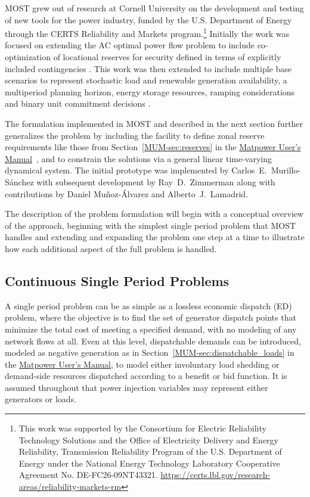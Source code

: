\documentclass[12pt]{article}
\newcommand{\mpver}[0]{7.1}
\newcommand{\matpower}[0]{{\sc Matpower}}
\newcommand{\most}[0]{{MOST}}
\newcommand{\mumurl}[0]{https://matpower.org/docs/MATPOWER-manual-\mpver.pdf}
\newcommand{\mum}[0]{\href{\mumurl}{\matpower{} User's Manual}}
\numberwithin{equation}{section}
\numberwithin{table}{section}
\numberwithin{figure}{section}
\begin{document}
\most{} grew out of research at Cornell University on the development and testing of new tools for the power industry, funded by the U.S. Department of Energy through the CERTS Reliability and Markets program.\footnote{This work was supported by the Consortium for Electric Reliability Technology Solutions and the Office of Electricity Delivery and Energy Reliability, Transmission Reliability Program of the U.S. Department of Energy under the National Energy Technology Laboratory Cooperative Agreement No. DE-FC26-09NT43321. \url{https://certs.lbl.gov/research-areas/reliability-markets-rm}} Initially the work was focused on extending the AC optimal power flow problem to include co-optimization of locational reserves for security defined in terms of explicitly included contingencies \cite{superopf2008,murillo-sanchez2013}. This work was then extended to include multiple base scenarios to represent stochastic load and renewable generation availability, a multiperiod planning horizon, energy storage resources, ramping considerations and binary unit commitment decisions \cite{murillo-sanchez2013a}.

The formulation implemented in \most{} and described in the next section further generalizes the problem by including the facility to define zonal reserve requirements like those from Section~\ref{MUM-sec:reserves} in the \mum{}~\cite{matpower_manual}, and to constrain the solutions via a general linear time-varying dynamical system. The initial prototype was implemented by Carlos~E.~Murillo-S\'anchez with subsequent development by Ray~D.~Zimmerman along with contributions by Daniel Mu\~noz-\'Alvarez and Alberto~J.~Lamadrid.

The description of the problem formulation will begin with a conceptual overview of the approach, beginning with the simplest single period problem that \most{} handles and extending and expanding the problem one step at a time to illustrate how each additional aspect of the full problem is handled.

\subsection{Continuous Single Period Problems}

A single period problem can be as simple as a lossless economic dispatch (ED) problem, where the objective is to find the set of generator dispatch points that minimize the total cost of meeting a specified demand, with no modeling of any network flows at all. Even at this level, dispatchable demands can be introduced, modeled as negative generation as in Section~\ref{MUM-sec:dispatchable_loads} in the \mum{}, to model either involuntary load shedding or demand-side resources dispatched according to a benefit or bid function. It is assumed throughout that power injection variables may represent either generators or loads.
\end{document}
